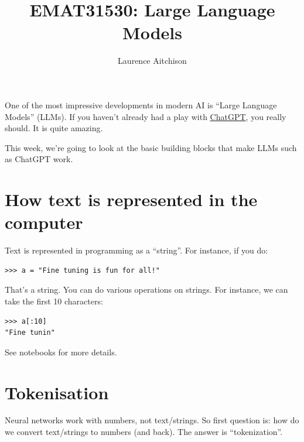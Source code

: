 \documentclass{article}
\title{EMAT31530: Large Language Models}
\author{Laurence Aitchison}
\date{}
\begin{document}
\maketitle

One of the most impressive developments in modern AI is ``Large Language Models'' (LLMs).
If you haven't already had a play with \href{https://chat.openai.com}{ChatGPT}, you really should.
It is quite amazing.

This week, we're going to look at the basic building blocks that make LLMs such as ChatGPT work.

\section{How text is represented in the computer}

Text is represented in programming as a ``string''.
For instance, if you do:
\begin{verbatim}
>>> a = "Fine tuning is fun for all!"
\end{verbatim}
That's a string.
You can do various operations on strings.  For instance, we can take the first 10 characters:
\begin{verbatim}
>>> a[:10]
"Fine tunin"
\end{verbatim}
See notebooks for more details.

\section{Tokenisation}

Neural networks work with numbers, not text/strings.
So first question is: how do we convert text/strings to numbers (and back).
The answer is ``tokenization''.
\end{document}
